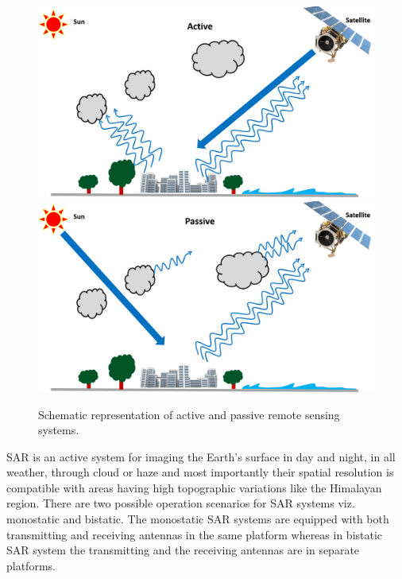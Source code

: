 \begin{figure}[!htbp]
	\centering
	\includegraphics[width=0.75\columnwidth]{Figure_General/Active_RS}\\
	\includegraphics[width=0.75\columnwidth]{Figure_General/passive_RS}	
	\caption{Schematic representation of active and passive remote sensing systems.} 
	\label{fig:microwave_img_sys}
\end{figure}

SAR is an active system for imaging the Earth’s surface in day and night, in all weather, through cloud or haze and most importantly their spatial resolution is compatible with areas having high topographic variations like the Himalayan region. There are two possible operation scenarios for SAR systems viz. monostatic and bistatic. The monostatic SAR systems are equipped with both transmitting and receiving antennas in the same platform whereas in bistatic SAR system the transmitting and the receiving antennas are in separate platforms.
